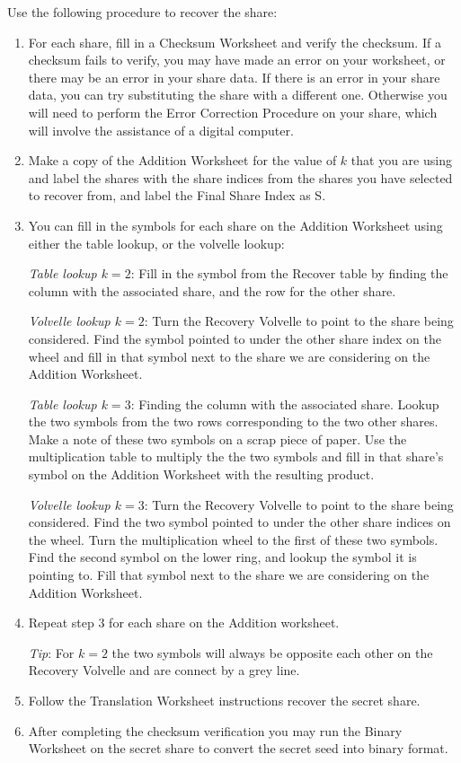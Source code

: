 \documentclass{article}
\newcommand{\tmem}[1]{{\em #1\/}}
\newcommand{\tmsamp}[1]{\textsf{#1}}
\newenvironment{enumeratenumeric}{\begin{enumerate}[1.] }{\end{enumerate}}
\begin{document}
Use the following procedure to recover the share:
\begin{enumeratenumeric}
  \item For each share, fill in a Checksum Worksheet and verify the checksum.
  If a checksum fails to verify, you may have made an error on your worksheet,
  or there may be an error in your share data. If there is an error in your
  share data, you can try substituting the share with a different one.
  Otherwise you will need to perform the Error Correction Procedure on your
  share, which will involve the assistance of a digital computer.
  
  \item Make a copy of the Addition Worksheet for the value of $k$ that you
  are using and label the shares with the share indices from the shares you
  have selected to recover from, and label the Final Share Index as
  {\tmsamp{S}}.
  
  \item You can fill in the symbols for each share on the Addition Worksheet
  using either the table lookup, or the volvelle lookup:
  
  {\tmem{Table lookup $k = 2$}}: Fill in the symbol from the Recover table by
  finding the column with the associated share, and the row for the other
  share.
  
  {\tmem{Volvelle lookup $k = 2$}}: Turn the Recovery Volvelle to point to the
  share being considered. Find the symbol pointed to under the other share
  index on the wheel and fill in that symbol next to the share we are
  considering on the Addition Worksheet.
  
  {\tmem{Table lookup $k = 3$}}: Finding the column with the associated share.
  Lookup the two symbols from the two rows corresponding to the two other
  shares. Make a note of these two symbols on a scrap piece of paper. Use the
  multiplication table to multiply the the two symbols and fill in that
  share's symbol on the Addition Worksheet with the resulting product.
  
  {\tmem{Volvelle lookup $k = 3$}}: Turn the Recovery Volvelle to point to the
  share being considered. Find the two symbol pointed to under the other share
  indices on the wheel. Turn the multiplication wheel to the first of these
  two symbols. Find the second symbol on the lower ring, and lookup the symbol
  it is pointing to. Fill that symbol next to the share we are considering on
  the Addition Worksheet.
  
  \item Repeat step 3 for each share on the Addition worksheet.
  
  {\tmem{Tip}}: For $k = 2$ the two symbols will always be opposite each other
  on the Recovery Volvelle and are connect by a grey line.
  
  \item Follow the Translation Worksheet instructions recover the secret
  share.
  
  \item After completing the checksum verification you may run the Binary
  Worksheet on the secret share to convert the secret seed into binary format.
\end{enumeratenumeric}
\end{document}
